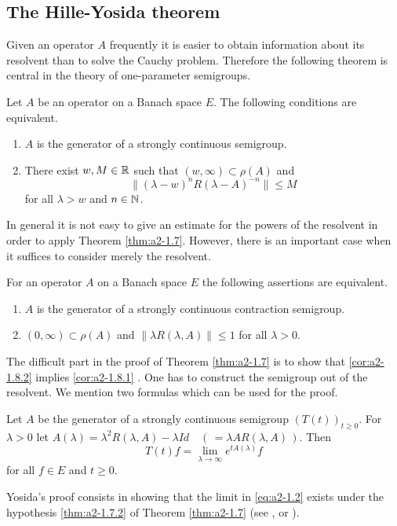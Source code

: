 \subsection{The Hille-Yosida theorem} \label{subsec:a2-1.se3}
Given an operator $A$ frequently it is easier to obtain information about its resolvent than to solve the Cauchy problem.
Therefore the following theorem is central in the theory of one-parameter semigroups.
\begin{theorem}\label{thm:a2-1.7}
Let $A$ be an operator on a Banach space $E$.
The following conditions are equivalent.
\begin{enumerate}[\upshape (a)]
\item \label{thm:a2-1.7.1}
$A$ is the generator of a strongly continuous semigroup.
\item \label{thm:a2-1.7.2}
There exist $w, M \in \mathbb{R}$ such that $(w,\infty) \subset \rho(A)$ and
\[
    \| {(\lambda - w)^{n}} R(\lambda-A)^{-n}\| \leq M 
\]
for all $\lambda > w$ and $n \in \mathbb{N}$.
\end{enumerate}
\end{theorem}
In general it is not easy to give an estimate for the powers of the resolvent in order to apply Theorem \ref{thm:a2-1.7}. 
However, there is an important case when it suffices to consider merely the resolvent.
\begin{corollary}\label{cor:a2-1.8}
For an operator $A$ on a Banach space $E$ the following assertions are equivalent.
\begin{enumerate}[\upshape (a)]
\item \label{cor:a2-1.8.1}
$A$ is the generator of a strongly continuous contraction semigroup.
\item \label{cor:a2-1.8.2}
$(0,\infty) \subset \rho(A)$ and $\|\lambda R(\lambda,A)\| \leq 1$ for all $\lambda > 0$.
\end{enumerate}
\end{corollary}
The difficult part in the proof of Theorem \ref{thm:a2-1.7}   is to show that \ref{cor:a2-1.8.2}   implies \ref{cor:a2-1.8.1}  . 
One has to construct the semigroup out of the resolvent.
We mention two formulas which can be used for the proof.
\begin{proposition}\label{prop:a2-1.9}
Let $A$ be the generator of a strongly continuous semigroup
$(T(t))_{t \geq 0}$.
For $\lambda > 0$ let 
$A(\lambda) = \lambda^{2}R(\lambda,A)-\lambda Id  \quad (\,=\lambda A R(\lambda,A)\,)$.
Then
\begin{equation}\label{eq:a2-1.2}
    T(t)f = \lim_{\lambda \to \infty} e^{tA(\lambda)}f
\end{equation}
for all $f \in E$ and $t \geq 0$.
\end{proposition}
Yosida's proof consists in showing that the limit in \eqref{eq:a2-1.2} exists under the hypothesis  \ref{thm:a2-1.7.2} of Theorem  \ref{thm:a2-1.7}  
(see \citet{davies:1980}, \citet{goldstein:1985b} or \citet{pazy:1982}).

